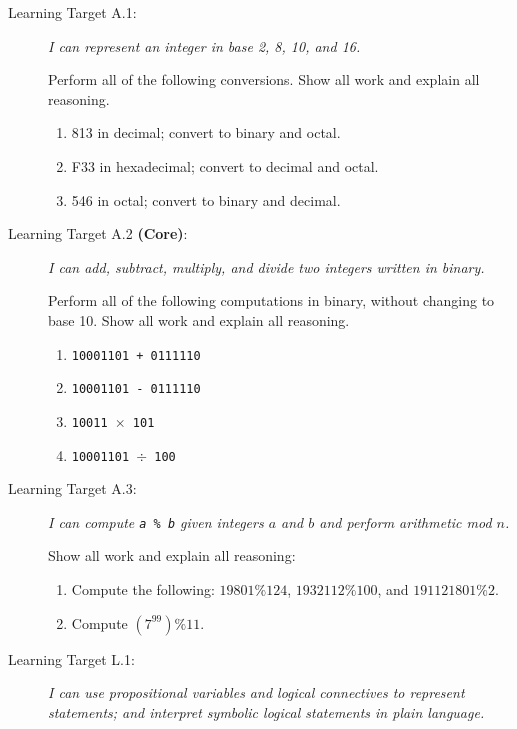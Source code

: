 \documentclass[11 pt]{article}
\begin{document}
\begin{description}
\item[Learning Target A.1:] \emph{I can represent an integer in base 2, 8, 10, and 16.}

Perform all of the following conversions. Show all work and explain all reasoning. 

\begin{enumerate}
    \item 813 in decimal; convert to binary and octal. 
    \item F33 in hexadecimal; convert to decimal and octal. 
    \item 546 in octal; convert to binary and decimal. 
\end{enumerate}

\vspace{0.2in}
\hline

\item[Learning Target A.2 \textbf{(Core)}:] \emph{I can add, subtract, multiply, and divide two integers written in binary.}

Perform all of the following computations in binary, without changing to base 10. Show all work and explain all reasoning. 

\begin{enumerate}
    \item \texttt{10001101 + 0111110} 
    \item \texttt{10001101 - 0111110} 
    \item \texttt{10011 $\times$ 101}
    \item \texttt{10001101 $\div$ 100}
\end{enumerate}

\vspace{0.2in}
\hline

\item[Learning Target A.3:] \emph{I can compute \texttt{a \% b} given integers $a$ and $b$ and perform arithmetic mod $n$.}

Show all work and explain all reasoning: 
\begin{enumerate}
    \item Compute the following: $19801 \% 124$, $1932112 \% 100$, and $191121801 \% 2$.
    \item Compute $\left(7^{99}\right) \%  11$. 
\end{enumerate}

\vspace{0.2in}
\hline

\item[Learning Target L.1:] \emph{I can use propositional variables and logical connectives to represent statements; and interpret symbolic logical statements in plain language.}


\end{description}
\end{document}
